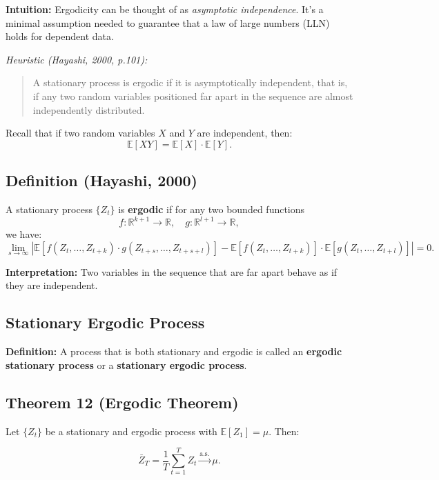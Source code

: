 \documentclass[12pt, oneside]{article}
\begin{document}
\textbf{Intuition:} Ergodicity can be thought of as \textit{asymptotic independence}. It’s a minimal assumption needed to guarantee that a law of large numbers (LLN) holds for dependent data.

\vspace{1em}
\textit{Heuristic (Hayashi, 2000, p.101):}
\begin{quote}
A stationary process is ergodic if it is asymptotically independent, that is, if any two random variables positioned far apart in the sequence are almost independently distributed.
\end{quote}

Recall that if two random variables \( X \) and \( Y \) are independent, then:
\[
\mathbb{E}[XY] = \mathbb{E}[X] \cdot \mathbb{E}[Y].
\]

\subsection*{Definition (Hayashi, 2000)}

A stationary process \( \{Z_t\} \) is \textbf{ergodic} if for any two bounded functions 
\[
f : \mathbb{R}^{k+1} \rightarrow \mathbb{R}, \quad g : \mathbb{R}^{l+1} \rightarrow \mathbb{R},
\]
we have:
\[
\lim_{s \to \infty} 
\left|
\mathbb{E} \left[ f(Z_t, \dots, Z_{t+k}) \cdot g(Z_{t+s}, \dots, Z_{t+s+l}) \right] 
- 
\mathbb{E}[f(Z_t, \dots, Z_{t+k})] \cdot \mathbb{E}[g(Z_t, \dots, Z_{t+l})]
\right| = 0.
\]

\textbf{Interpretation:} Two variables in the sequence that are far apart behave as if they are independent.

\subsection*{Stationary Ergodic Process}

\textbf{Definition:} A process that is both stationary and ergodic is called an \textbf{ergodic stationary process} or a \textbf{stationary ergodic process}.

\subsection*{Theorem 12 (Ergodic Theorem)}

Let \( \{Z_t\} \) be a stationary and ergodic process with \( \mathbb{E}[Z_1] = \mu \). Then:

\[
\bar{Z}_T = \frac{1}{T} \sum_{t=1}^T Z_t \xrightarrow{\text{a.s.}} \mu.
\]
\end{document}

